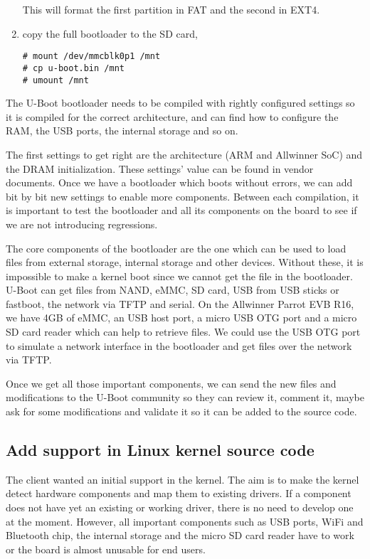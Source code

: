 \begin{enumerate}
This will format the first partition in FAT and the second in EXT4.

  \item copy the full bootloader to the SD card,

\begin{verbatim}
# mount /dev/mmcblk0p1 /mnt
# cp u-boot.bin /mnt
# umount /mnt
\end{verbatim}
\end{enumerate}

The U-Boot bootloader needs to be compiled with rightly configured settings so it is compiled for the correct architecture, and can find how to configure the RAM, the USB ports, the internal storage and so on.

The first settings to get right are the architecture (ARM and Allwinner SoC) and the DRAM initialization. These settings' value can be found in vendor documents. Once we have a bootloader which boots without errors, we can add bit by bit new settings to enable more components. Between each compilation, it is important to test the bootloader and all its components on the board to see if we are not introducing regressions.

The core components of the bootloader are the one which can be used to load files from external storage, internal storage and other devices. Without these, it is impossible to make a kernel boot since we cannot get the file in the bootloader. U-Boot can get files from NAND, eMMC, SD card, USB from USB sticks or fastboot, the network via TFTP and serial. On the Allwinner Parrot EVB R16, we have 4GB of eMMC, an USB host port, a micro USB OTG port and a micro SD card reader which can help to retrieve files. We could use the USB OTG port to simulate a network interface in the bootloader and get files over the network via TFTP.

Once we get all those important components, we can send the new files and modifications to the U-Boot community so they can review it, comment it, maybe ask for some modifications and validate it so it can be added to the source code.

\subsection{Add support in Linux kernel source code}

The client wanted an initial support in the kernel. The aim is to make the kernel detect hardware components and map them to existing drivers. If a component does not have yet an existing or working driver, there is no need to develop one at the moment. However, all important components such as USB ports, WiFi and Bluetooth chip, the internal storage and the micro SD card reader have to work or the board is almost unusable for end users.

